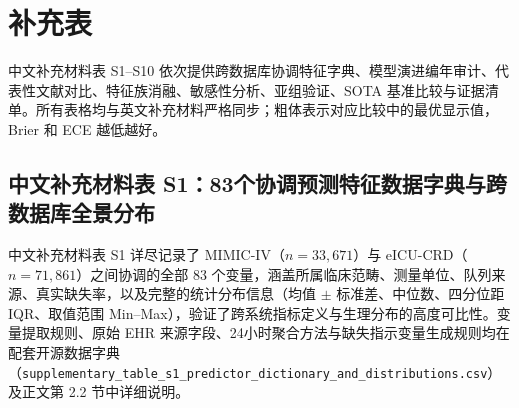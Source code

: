\documentclass[11pt]{ctexart}
\begin{document}
\clearpage

\section*{补充表}

中文补充材料表 S1--S10 依次提供跨数据库协调特征字典、模型演进编年审计、代表性文献对比、特征族消融、敏感性分析、亚组验证、SOTA 基准比较与证据清单。所有表格均与英文补充材料严格同步；粗体表示对应比较中的最优显示值，Brier 和 ECE 越低越好。

\subsection*{中文补充材料表 S1：83个协调预测特征数据字典与跨数据库全景分布}
\label{sec:tab_s1}

中文补充材料表 S1 详尽记录了 MIMIC-IV（$n = 33{,}671$）与 eICU-CRD（$n = 71{,}861$）之间协调的全部 83 个变量，涵盖所属临床范畴、测量单位、队列来源、真实缺失率，以及完整的统计分布信息（均值 $\pm$ 标准差、中位数、四分位距 IQR、取值范围 Min--Max），验证了跨系统指标定义与生理分布的高度可比性。变量提取规则、原始 EHR 来源字段、24小时聚合方法与缺失指示变量生成规则均在配套开源数据字典（\texttt{supplementary\_table\_s1\_predictor\_dictionary\_and\_distributions.csv}）及正文第 2.2 节中详细说明。
\end{document}
